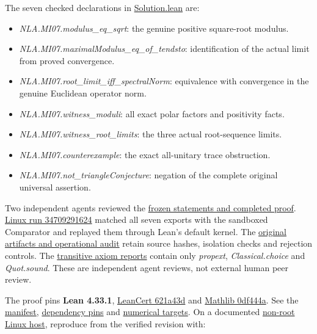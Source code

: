 \documentclass[11pt,a4paper]{article}
\providecommand{\tightlist}{\setlength{\itemsep}{0pt}\setlength{\parskip}{0pt}}
\begin{document}
The seven checked declarations in
\href{https://github.com/sgstepaniants/OpenProblemsInNLA/blob/f55777156432043de4201747a3759e0c6485e568/matrix-inequalities-and-norms/MI-07/lean/Solution.lean}{Solution.lean}
are:

\begin{itemize}
\tightlist
\item
  \textit{NLA.MI07.modulus\_eq\_sqrt}: the genuine positive square-root
  modulus.
\item
  \textit{NLA.MI07.maximalModulus\_eq\_of\_tendsto}: identification of
  the actual limit from proved convergence.
\item
  \textit{NLA.MI07.root\_limit\_iff\_spectralNorm}: equivalence with
  convergence in the genuine Euclidean operator norm.
\item
  \textit{NLA.MI07.witness\_moduli}: all exact polar factors and
  positivity facts.
\item
  \textit{NLA.MI07.witness\_root\_limits}: the three actual
  root-sequence limits.
\item
  \textit{NLA.MI07.counterexample}: the exact all-unitary trace
  obstruction.
\item
  \textit{NLA.MI07.not\_triangleConjecture}: negation of the complete
  original universal assertion.
\end{itemize}

Two independent agents reviewed the
\href{https://github.com/ajt60gaibb/OpenProblemsInNLA/blob/main/matrix-inequalities-and-norms/MI-07/lean/reviews}{frozen
statements and completed proof}.
\href{https://github.com/sgstepaniants/OpenProblemsInNLA/actions/runs/34709291624}{Linux
run 34709291624} matched all seven exports with the sandboxed Comparator
and replayed them through Lean's default kernel. The
\href{https://github.com/ajt60gaibb/OpenProblemsInNLA/blob/main/matrix-inequalities-and-norms/MI-07/lean/verification/linux-2026-09-12}{original
artifacts and operational audit} retain source hashes, isolation checks
and rejection controls. The
\href{https://github.com/ajt60gaibb/OpenProblemsInNLA/blob/main/matrix-inequalities-and-norms/MI-07/lean/reviews/proof-axioms.log}{transitive
axiom reports} contain only \textit{propext}, \textit{Classical.choice}
and \textit{Quot.sound}. These are independent agent reviews, not
external human peer review.

The proof pins \textbf{Lean 4.33.1},
\href{https://github.com/alerad/leancert/tree/621a43d7cf21f87872392a01e874f2f1dbddc926}{LeanCert
621a43d} and
\href{https://github.com/leanprover-community/mathlib4/tree/0df444a360eaa60ab8c11dca51a86af692955474}{Mathlib
0df444a}. See the
\href{https://github.com/ajt60gaibb/OpenProblemsInNLA/blob/main/matrix-inequalities-and-norms/MI-07/lean/formalization.yaml}{manifest},
\href{https://github.com/ajt60gaibb/OpenProblemsInNLA/blob/main/matrix-inequalities-and-norms/MI-07/lean/lake-manifest.json}{dependency
pins} and
\href{https://github.com/ajt60gaibb/OpenProblemsInNLA/blob/main/matrix-inequalities-and-norms/MI-07/lean/NUMERICAL_TARGETS.md}{numerical
targets}. On a documented
\href{https://github.com/ajt60gaibb/OpenProblemsInNLA/blob/main/tools/lean/HARNESS.md}{non-root
Linux host}, reproduce from the verified revision with:
\end{document}

